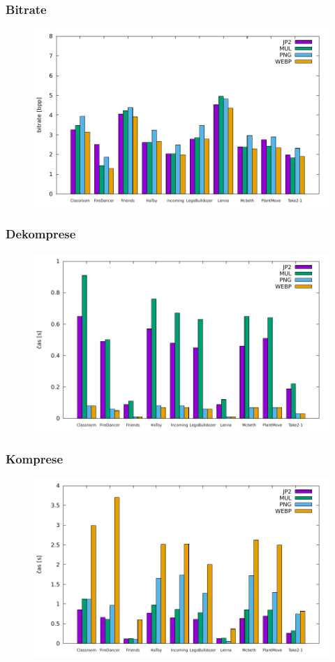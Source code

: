 \documentclass{beamer}
\begin{document}
\begin{frame}
  \center
  \frametitle{Bitrate}
  \begin{figure}
    \includegraphics[width=\linewidth]{bitrate.pdf}
  \end{figure}
\end{frame}

\begin{frame}
  \center
  \frametitle{Dekomprese}
  \begin{figure}
    \includegraphics[width=\linewidth]{decompress_time.pdf}
  \end{figure}
\end{frame}

\begin{frame}
  \center
  \frametitle{Komprese}
  \begin{figure}
    \includegraphics[width=\linewidth]{compress_time.pdf}
  \end{figure}
\end{frame}
\end{document}
